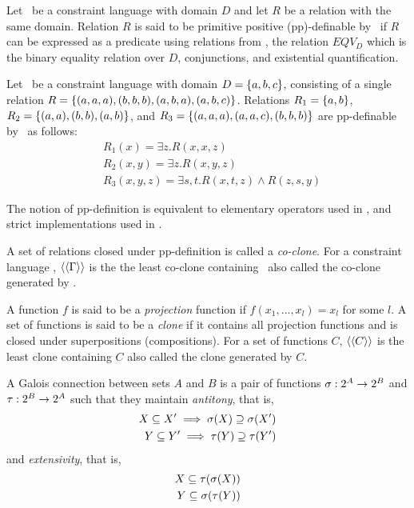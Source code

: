 \begin{defi}[pp-definition]
Let \mrelset\ be a constraint language with domain \(D\) and 
let \(R\) be a relation with the same domain.
Relation \(R\) is said to be primitive positive (pp)-definable by \mrelset\
if \(R\) can be expressed as a predicate using relations from \mrelset,
the relation \(EQV_D\) which is the binary equality relation over \(D\),  conjunctions, and
existential quantification.
\end{defi}

\begin{example} \label{exm:ppd} 
Let \mrelset\ be a constraint language with domain \(D=\{{a,b,c}\}\), 
consisting of a single relation 
\(R=\{{(a,a,a),(b,b,b),(a,b,a),(a,b,c)}\}\)\@.
Relations 
\(R_1=\{{a,b}\}\), 
\(R_2=\{{(a,a),(b,b),(a,b)}\}\), 
and
\(R_3=\{{(a,a,a),(a,a,c),(b,b,b)}\}\) are pp-definable by \mrelset\ as follows:
\begin{align*}
&R_1(x)=\exists z.R(x,x,z)\\
&R_2(x,y)=\exists z.R(x,y,z)\\
&R_3(x,y,z)=\exists s,t.R(x,t,z)\land R(z,s,y)
\end{align*}
\end{example}

The notion of  pp-definition is equivalent to elementary operators used in \cite{post41,bkkr69,lau},
and strict implementations used in \cite{madu,Trichotomy}\@.

A set of relations closed under pp-definition is called a \emph{co-clone}.
For a constraint language \mrelset, \(\langle\langle \Gamma \rangle\rangle\) is the the least co-clone containing
\mrelset\ also called the co-clone generated by \mrelset\@.

A function \(f\) is said to be a \emph{projection} function if \(f(x_1,\dotsc,x_l)=x_l\) 
for some \(l\)\@.
A set of functions is said to be a \emph{clone} if it contains all projection
functions and is closed under superpositions (compositions). For a set of functions
\(C\), \(\langle\langle C \rangle\rangle\) is the least clone containing \(C\) also called the clone generated by \(C\)\@.

A Galois connection between sets \(A\) and \(B\) is a pair of functions
\(\sigma:2^{A} \to 2^{B}\) and \(\tau:2^{B} \to 2^{A}\) 
such that they maintain {\em antitony}, that is,
\begin{align*}
X \subseteq X' \implies \sigma(X) \supseteq \sigma(X') \\
Y \subseteq Y' \implies \tau(Y) \supseteq \tau(Y') \\
\end{align*}
and {\em extensivity}, that is,
\begin{align*}
X \subseteq \tau(\sigma(X)) \\
Y \subseteq \sigma(\tau(Y))
\end{align*}

